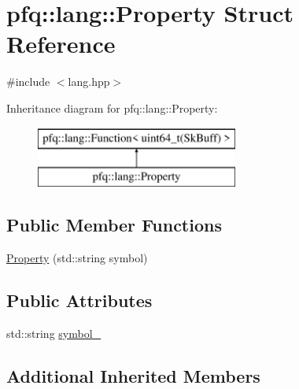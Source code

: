 \hypertarget{structpfq_1_1lang_1_1Property}{\section{pfq\+:\+:lang\+:\+:Property Struct Reference}
\label{structpfq_1_1lang_1_1Property}
}


{\ttfamily \#include $<$lang.\+hpp$>$}

Inheritance diagram for pfq\+:\+:lang\+:\+:Property\+:\begin{figure}[H]
\begin{center}
\leavevmode
\includegraphics[height=2.000000cm]{structpfq_1_1lang_1_1Property}
\end{center}
\end{figure}
\subsection*{Public Member Functions}
\begin{DoxyCompactItemize}
\item 
\hyperlink{structpfq_1_1lang_1_1Property_a1db5bd07efa67a8fd41320150b788096}{Property} (std\+::string symbol)
\end{DoxyCompactItemize}
\subsection*{Public Attributes}
\begin{DoxyCompactItemize}
\item 
std\+::string \hyperlink{structpfq_1_1lang_1_1Property_a9d42c07009ac00fdc93bde1d50a52790}{symbol\+\_\+}
\end{DoxyCompactItemize}
\subsection*{Additional Inherited Members}


